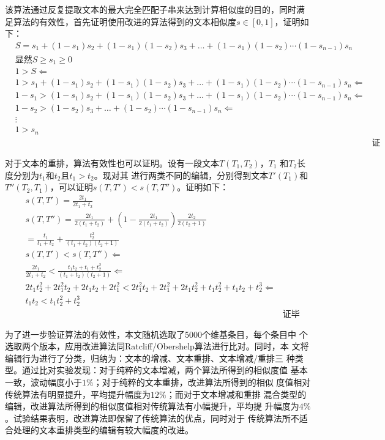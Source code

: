 该算法通过反复提取文本的最大完全匹配子串来达到计算相似度的目的，同时满
足算法的有效性，首先证明使用改进的算法得到的文本相似度$s \in [0,1]$，证明如下：
\begin{eqnarray*}
  \label{eq:2}
&S=s_1+(1-s_1)s_2+(1-s_1)(1-s_2)s_3+\ldots+(1-s_1)(1-s_2)
\cdots (1-s_{n-1})s_n& \\
&\text{显然}S \geq s_1 \geq 0& \\
&1>S \Leftarrow & \\
&1>s_1+(1-s_1)s_2+(1-s_1)(1-s_2)s_3+\ldots+(1-s_1)(1-s_2)
\cdots (1-s_{n-1})s_n \Leftarrow & \\
&1-s_1>(1-s_1)s_2+(1-s_1)(1-s_2)s_3+\ldots+(1-s_1)(1-s_2)
\cdots (1-s_{n-1})s_n \Leftarrow & \\
& 1-s_2>(1-s_2)s_3+\ldots+(1-s_2)
\cdots (1-s_{n-1})s_n \Leftarrow & \\
&\vdots& \\
&1>s_n& \\
&&\text{证毕}
\end{eqnarray*}

对于文本的重排，算法有效性也可以证明。设有一段文本$T(T_1,T_2)$，$T_1$
和$T_2$长度分别为$t_1$和$t_2$且$t_1>t_2$。现对其
进行两类不同的编辑，分别得到文本$T'(T_1)$和$T''(T_2,T_1)$，可以证明$s(T,T')<s(T,T'')$。证明如下：
\begin{eqnarray*}
  \label{eq:3}
&s(T,T')=\frac{2t_1}{2t_1+t_2}& \\
&s(T,T'')=\frac{2t_1}{2(t_1+t_2)}+(1-\frac{2t_1}{2(t_1+t_2)})\frac{2t_2}{2(t_2+1)}&\\
         &=\frac{t_1}{t_1+t_2}+\frac{t_2^2}{(t_1+t_2)(t_2+1)}& \\
&s(T,T')<s(T,T'') \Leftarrow&   \\
&\frac{2t_1}{2t_1+t_2}<\frac{t_1t_2+t_1+t_2^2}{(t_1+t_2)(t_2+1)} \Leftarrow& \\
&2t_1t_2^2+2t_1^2t_2+2t_1t_2+2t_1^2<2t_1^2t_2+2t_1^2+2t_1t_2^2+t_1t_2^2+t_1t_2+t_2^3
\Leftarrow & \\
&t_1t_2<t_1t_2^2+t_2^3& \\
&&\text{证毕}
\end{eqnarray*}

为了进一步验证算法的有效性，本文随机选取了5000个维基条目，每个条目中
个选取两个版本，应用改进算法同Ratcliff/Obershelp算法进行比对。同时，本
文将编辑行为进行了分类，归纳为：文本的增减、文本重排、文本增减/重排三
种类型。通过比对实验发现：对于纯粹的文本增减，两个算法所得到的相似度值
基本一致，波动幅度小于$1\%$；对于纯粹的文本重排，改进算法所得到的相似
度值相对传统算法有明显提升，平均提升幅度为$12\%$；而对于文本增减和重排
混合类型的编辑，改进算法所得到的相似度值相对传统算法有小幅提升，平均提
升幅度为$4\%$。试验结果表明，改进算法即保留了传统算法的优点，同时对于
传统算法所不适合处理的文本重排类型的编辑有较大幅度的改进。

